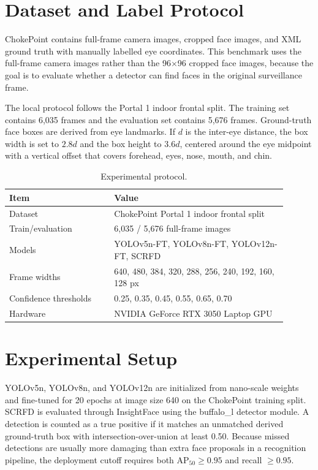 \documentclass[conference]{IEEEtran}
\begin{document}
\section{Dataset and Label Protocol}
ChokePoint contains full-frame camera images, cropped face images, and XML ground truth with manually labelled eye coordinates. This benchmark uses the full-frame camera images rather than the 96$\times$96 cropped face images, because the goal is to evaluate whether a detector can find faces in the original surveillance frame.

The local protocol follows the Portal 1 indoor frontal split. The training set contains 6,035 frames and the evaluation set contains 5,676 frames. Ground-truth face boxes are derived from eye landmarks. If $d$ is the inter-eye distance, the box width is set to $2.8d$ and the box height to $3.6d$, centered around the eye midpoint with a vertical offset that covers forehead, eyes, nose, mouth, and chin.

\begin{table}[htbp]
\caption{Experimental protocol.}
\label{tab:protocol}
\centering
\begin{tabular}{p{0.34\linewidth}p{0.56\linewidth}}
\toprule
Item & Value \\
\midrule
Dataset & ChokePoint Portal 1 indoor frontal split \\
Train/evaluation & 6,035 / 5,676 full-frame images \\
Models & YOLOv5n-FT, YOLOv8n-FT, YOLOv12n-FT, SCRFD \\
Frame widths & 640, 480, 384, 320, 288, 256, 240, 192, 160, 128 px \\
Confidence thresholds & 0.25, 0.35, 0.45, 0.55, 0.65, 0.70 \\
Hardware & NVIDIA GeForce RTX 3050 Laptop GPU \\
\bottomrule
\end{tabular}
\end{table}

\section{Experimental Setup}
YOLOv5n, YOLOv8n, and YOLOv12n are initialized from nano-scale weights and fine-tuned for 20 epochs at image size 640 on the ChokePoint training split. SCRFD is evaluated through InsightFace using the buffalo\_l detector module. A detection is counted as a true positive if it matches an unmatched derived ground-truth box with intersection-over-union at least 0.50. Because missed detections are usually more damaging than extra face proposals in a recognition pipeline, the deployment cutoff requires both AP$_{50}\geq0.95$ and recall $\geq0.95$.
\end{document}
